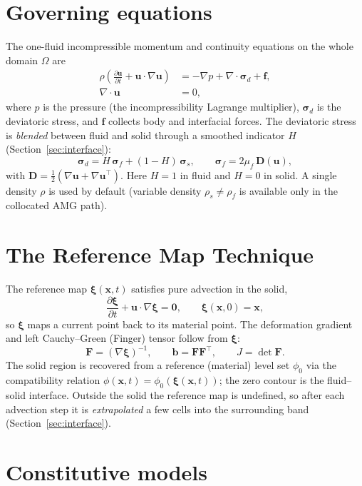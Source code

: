 \documentclass[11pt]{article}
\newcommand{\xv}{\bm{x}}
\newcommand{\uv}{\bm{u}}
\newcommand{\xiv}{\bm{\xi}}
\newcommand{\Ften}{\bm{F}}
\newcommand{\bten}{\bm{b}}
\newcommand{\grad}{\nabla}
\newcommand{\dd}[2]{\frac{\partial #1}{\partial #2}}
\begin{document}
\section{Governing equations}
The one-fluid incompressible momentum and continuity equations on the whole domain
$\Omega$ are
\begin{align}
\rho\!\left(\dd{\uv}{t}+\uv\!\cdot\!\grad\uv\right)
&= -\grad p + \grad\!\cdot\!\bm{\sigma}_{\!d} + \bm{f}, \\
\grad\!\cdot\!\uv &= 0,
\end{align}
where $p$ is the pressure (the incompressibility Lagrange multiplier),
$\bm{\sigma}_{\!d}$ is the deviatoric stress, and $\bm{f}$ collects body and
interfacial forces. The deviatoric stress is \emph{blended} between fluid and solid
through a smoothed indicator $H$ (Section~\ref{sec:interface}):
\begin{equation}
\bm{\sigma}_{\!d} = H\,\bm{\sigma}_{\!f} + (1-H)\,\bm{\sigma}_{\!s},
\qquad
\bm{\sigma}_{\!f} = 2\mu_f\,\bm{D}(\uv),
\label{eq:blend}
\end{equation}
with $\bm{D}=\tfrac12(\grad\uv+\grad\uv^{\!\top})$. Here $H=1$ in fluid and $H=0$
in solid. A single density $\rho$ is used by default (variable density
$\rho_s\neq\rho_f$ is available only in the collocated AMG path).

\section{The Reference Map Technique}
The reference map $\xiv(\xv,t)$ satisfies pure advection in the solid,
\begin{equation}
\dd{\xiv}{t}+\uv\!\cdot\!\grad\xiv = \bm{0},
\qquad \xiv(\xv,0)=\xv ,
\label{eq:xi}
\end{equation}
so $\xiv$ maps a current point back to its material point. The deformation gradient
and left Cauchy--Green (Finger) tensor follow from $\xiv$:
\begin{equation}
\Ften = (\grad\xiv)^{-1},\qquad \bten = \Ften\Ften^{\!\top},\qquad J=\det\Ften .
\end{equation}
The solid region is recovered from a reference (material) level set $\phi_0$ via the
compatibility relation $\phi(\xv,t)=\phi_0(\xiv(\xv,t))$; the zero contour is the
fluid--solid interface. Outside the solid the reference map is undefined, so after
each advection step it is \emph{extrapolated} a few cells into the surrounding band
(Section~\ref{sec:interface}).

\section{Constitutive models}
\end{document}
